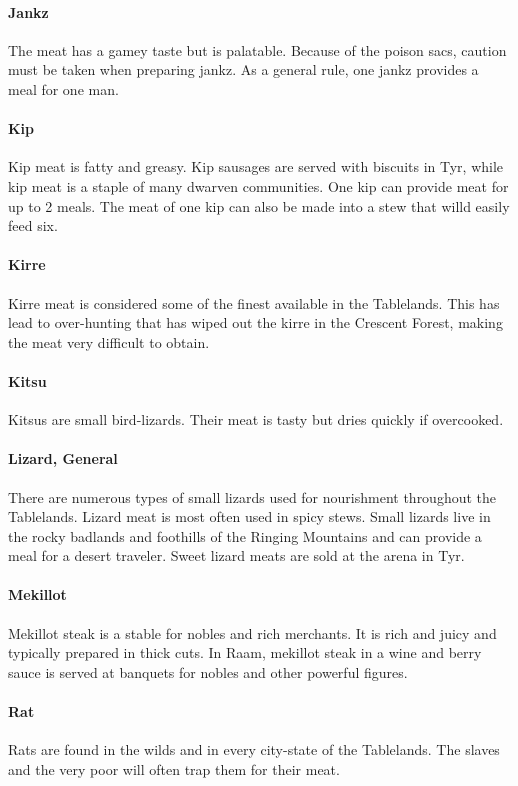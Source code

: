 \begin{multicols}{2}
\paragraph{Jankz} The meat has a gamey taste but is palatable. Because of the poison sacs, caution must be taken when preparing jankz. As a general rule, one jankz provides a meal for one man.\\
\paragraph{Kip} Kip meat is fatty and greasy. Kip sausages are served with biscuits in Tyr, while kip meat is a staple of many dwarven communities. One kip can provide meat for up to 2 meals. The meat of one kip can also be made into a stew that willd easily feed six.\\
\paragraph{Kirre} Kirre meat is considered some of the finest available in the Tablelands. This has lead to over-hunting that has wiped out the kirre in the Crescent Forest, making the meat very difficult to obtain.\\
\paragraph{Kitsu} Kitsus are small bird-lizards. Their meat is tasty but dries quickly if overcooked.\\
\paragraph{Lizard, General} There are numerous types of small lizards used for nourishment throughout the Tablelands. Lizard meat is most often used in spicy stews. Small lizards live in the rocky badlands and foothills of the Ringing Mountains and can provide a meal for a desert traveler. Sweet lizard meats are sold at the arena in Tyr.\\
\paragraph{Mekillot} Mekillot steak is a stable for nobles and rich merchants. It is rich and juicy and typically prepared in thick cuts. In Raam, mekillot steak in a wine and berry sauce is served at banquets for nobles and other powerful figures.\\
\paragraph{Rat} Rats are found in the wilds and in every city-state of the Tablelands. The slaves and the very poor will often trap them for their meat.\\

\end{multicols}
